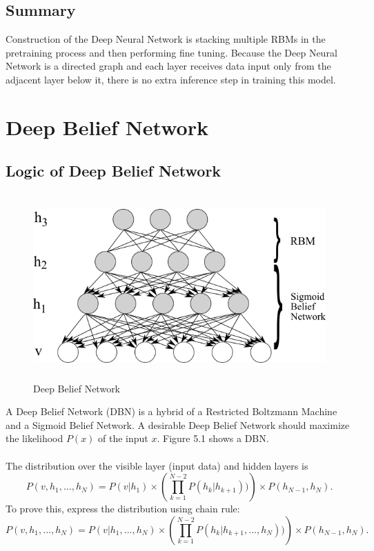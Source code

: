 \documentclass[12pt]{article}
\begin{document}
\subsection{Summary}
Construction of the Deep Neural Network is stacking multiple RBMs in the pretraining process and then performing fine tuning. Because the Deep Neural Network is a directed graph and each layer receives data input only from the adjacent layer below it, there is no extra inference step in training this model.
\clearpage
\section{Deep Belief Network}
\subsection{Logic of Deep Belief Network}
\begin{figure}[h]
\centering
\includegraphics[height=2.8in]{DBN.png}
\caption{Deep Belief Network} \label{fig:side:a}
\end{figure}
A Deep Belief Network (DBN) is a hybrid of a Restricted Boltzmann Machine and a Sigmoid Belief Network. A desirable Deep Belief Network should maximize the likelihood $P(x)$ of the input $x$. Figure 5.1 shows a DBN.\\
\\
The distribution over the visible layer (input data) and hidden layers is\begin{equation}
P(v, h_1, ..., h_N)  = P(v| h_1) \times\left(\prod_{k=1}^{N-2}  P(h_k| h_{k+1}))\right)\times P(h_{N-1},h_N).
\end{equation}
To prove this, express the distribution using chain rule:\begin{equation}
P(v, h_1, ..., h_N)  = P(v| h_1, ..., h_N) \times\left(\prod_{k=1}^{N-2}  P(h_k| h_{k+1},..., h_{N}))\right)\times P(h_{N-1},h_N).
\end{equation}
\end{document}

